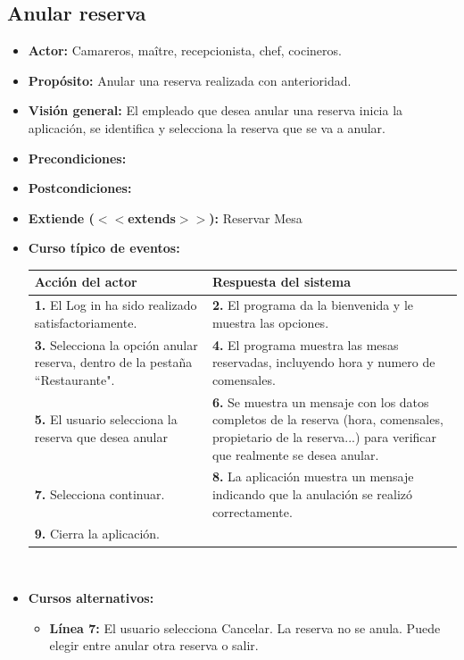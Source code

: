 \documentclass[spanish,a4paper,11pt, twoside]{report}	%
\begin{document}

		\subsection{Anular reserva}
			\begin{itemize}
			\item \textbf{Actor:} Camareros, maître, recepcionista, chef, cocineros.
			\item \textbf{Propósito:} Anular una reserva realizada con anterioridad.
			\item \textbf{Visión general:} El empleado que desea anular una reserva inicia la aplicación, se identifica y selecciona la reserva que se va a anular.
			\item \textbf{Precondiciones:} 
			\item \textbf{Postcondiciones:} 
			\item \textbf{Extiende ($<<$extends$>>$):} Reservar Mesa
			\item \textbf{Curso típico de eventos:} 	\\
				\begin{tabular}{|p{6cm}||p{6cm}|}
				\hline
				\textbf{Acción del actor} & \textbf{Respuesta del sistema} \\ \hline \hline
				\textbf{1.}  El Log in ha sido realizado satisfactoriamente. & \textbf{2.} El programa da la bienvenida y le muestra las opciones. \\ \hline
				\textbf{3.} Selecciona la opción anular reserva, dentro de la pestaña “Restaurante". & \textbf{4.} El programa muestra las mesas reservadas, incluyendo hora y numero de comensales. \\ \hline
				\textbf{5.} El usuario selecciona la reserva que desea anular	& \textbf{6.} Se muestra un mensaje con los datos completos de la reserva (hora, comensales, propietario de la reserva...) para verificar que realmente se desea anular. \\ \hline
				\textbf{7.} Selecciona continuar.	& \textbf{8.} La aplicación muestra un mensaje indicando que la anulación se realizó correctamente. \\ \hline
				\textbf{9.} Cierra la aplicación. & \textbf{} \\ \hline
			\end{tabular}
			\\
			\item \textbf{Cursos alternativos:} 
			\begin{itemize}
			\item  \textbf{Línea 7:} El usuario selecciona Cancelar. La reserva no se anula. Puede elegir entre anular otra reserva o salir.
			\end {itemize}
		\end {itemize}
	
\end{document}
